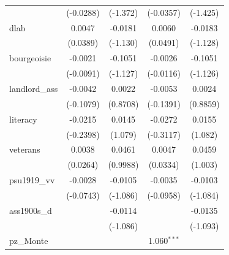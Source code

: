 \begin{table}[htbp]
\begin{tabular}{lcccc}
                                       & (-0.0288)             & (-1.372)               & (-0.0357)            & (-1.425)\\   
      dlab                             & 0.0047                & -0.0181                & 0.0060               & -0.0183\\   
                                       & (0.0389)              & (-1.130)               & (0.0491)             & (-1.128)\\   
      bourgeoisie                      & -0.0021               & -0.1051                & -0.0026              & -0.1051\\   
                                       & (-0.0091)             & (-1.127)               & (-0.0116)            & (-1.126)\\   
      landlord\_ass                    & -0.0042               & 0.0022                 & -0.0053              & 0.0024\\   
                                       & (-0.1079)             & (0.8708)               & (-0.1391)            & (0.8859)\\   
      literacy                         & -0.0215               & 0.0145                 & -0.0272              & 0.0155\\   
                                       & (-0.2398)             & (1.079)                & (-0.3117)            & (1.082)\\   
      veterans                         & 0.0038                & 0.0461                 & 0.0047               & 0.0459\\   
                                       & (0.0264)              & (0.9988)               & (0.0334)             & (1.003)\\   
      psu1919\_vv                      & -0.0028               & -0.0105                & -0.0035              & -0.0103\\   
                                       & (-0.0743)             & (-1.086)               & (-0.0958)            & (-1.084)\\   
      ass1900s\_d                      &                       & -0.0114                &                      & -0.0135\\   
                                       &                       & (-1.086)               &                      & (-1.093)\\   
      pz\_Monte                        &                       &                        & 1.060$^{***}$        &   \\   

\end{tabular}
\end{table}
